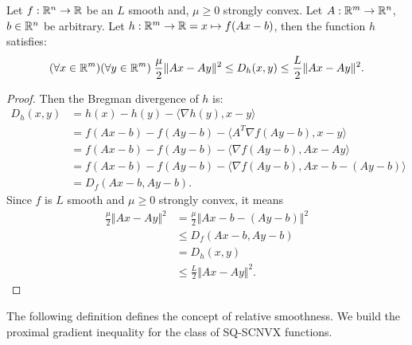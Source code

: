\documentclass[12pt]{article}
\begin{document}
            \begin{theorem}\label{thm:smooth-aff-sq-scnvs-fxn}
                Let $f: \mathbb R^n \rightarrow \mathbb R$ be an $L$ smooth and, $\mu \ge 0$ strongly convex. 
                Let $A: \mathbb R^m \rightarrow \mathbb R^n$, $b \in \mathbb R^n$ be arbitrary. 
                Let $h: \mathbb R^m \rightarrow \mathbb R= x \mapsto f(Ax - b)$, then the function $h$ satisfies: 
                \begin{align*}
                    (\forall x \in \mathbb R^m)(\forall y \in \mathbb R^m)\; \frac{\mu}{2}\Vert Ax - Ay\Vert^2 
                    \le D_h(x, y) \le \frac{L}{2}\Vert Ax - Ay\Vert^2. 
                \end{align*}
            \end{theorem}
            \begin{proof}
                Then the Bregman divergence of $h$ is: 
                \begin{align*}
                    D_h(x, y) &= h(x) - h(y) - \langle \nabla h(y), x - y\rangle
                    \\
                    &= f(Ax - b) - f(Ay - b) - \langle A^T\nabla f(Ay - b), x - y\rangle
                    \\
                    &= f(Ax - b) - f(Ay - b) - \langle \nabla f(Ay - b), Ax - Ay\rangle
                    \\
                    &= f(Ax - b) - f(Ay - b) - \langle \nabla f(Ay - b), Ax - b - (Ay - b)\rangle
                    \\
                    &= D_f(Ax - b, Ay - b). 
                \end{align*}
                Since $f$ is $L$ smooth and $\mu \ge 0$ strongly convex, it means 
                \begin{align*}
                    \frac{\mu}{2}\Vert Ax - Ay\Vert^2
                    &= 
                    \frac{\mu}{2}\Vert Ax - b - (Ay - b)\Vert^2 
                    \\
                    &\le D_f(Ax - b, Ay - b)
                    \\
                    &= D_h(x, y) 
                    \\
                    &\le \frac{L}{2} \Vert Ax - Ay\Vert^2. 
                \end{align*}
            \end{proof}
            The following definition defines the concept of relative smoothness. 
            We build the proximal gradient inequality for the class of SQ-SCNVX functions. 
\end{document}
